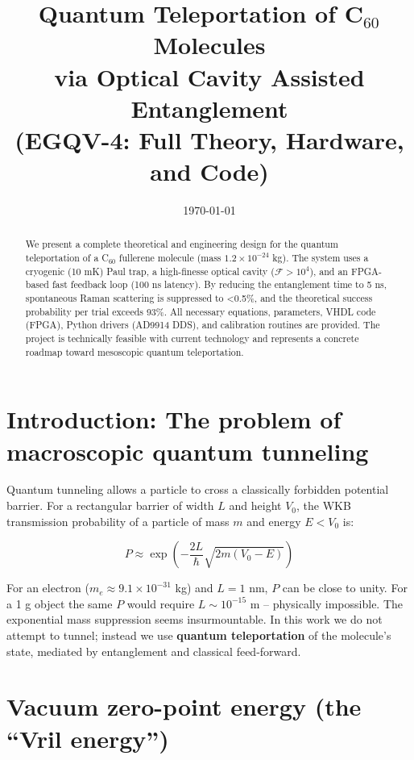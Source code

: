 \documentclass[12pt,a4paper]{article}
\title{Quantum Teleportation of C$_{60}$ Molecules \\
       via Optical Cavity Assisted Entanglement \\
       (EGQV-4: Full Theory, Hardware, and Code)}
\author{}
\date{\today}
\begin{document}
\maketitle

\begin{abstract}
We present a complete theoretical and engineering design for the quantum teleportation of a C$_{60}$ fullerene molecule (mass $1.2\times10^{-24}$ kg). The system uses a cryogenic (10 mK) Paul trap, a high-finesse optical cavity ($\mathcal{F}>10^4$), and an FPGA-based fast feedback loop (100 ns latency). By reducing the entanglement time to 5 ns, spontaneous Raman scattering is suppressed to <0.5\%, and the theoretical success probability per trial exceeds 93\%. All necessary equations, parameters, VHDL code (FPGA), Python drivers (AD9914 DDS), and calibration routines are provided. The project is technically feasible with current technology and represents a concrete roadmap toward mesoscopic quantum teleportation.
\end{abstract}

\tableofcontents

\newpage

\section{Introduction: The problem of macroscopic quantum tunneling}
Quantum tunneling allows a particle to cross a classically forbidden potential barrier. For a rectangular barrier of width $L$ and height $V_0$, the WKB transmission probability of a particle of mass $m$ and energy $E<V_0$ is:

\begin{equation}
P \approx \exp\!\left(-\frac{2L}{\hbar}\sqrt{2m(V_0-E)}\right) \label{eq:wkb}
\end{equation}

For an electron ($m_e\approx9.1\times10^{-31}$ kg) and $L=1$ nm, $P$ can be close to unity. For a 1 g object the same $P$ would require $L\sim10^{-15}$ m – physically impossible. The exponential mass suppression seems insurmountable. In this work we do not attempt to tunnel; instead we use \textbf{quantum teleportation} of the molecule's state, mediated by entanglement and classical feed-forward.

\section{Vacuum zero-point energy (the ``Vril energy'')}
\end{document}

